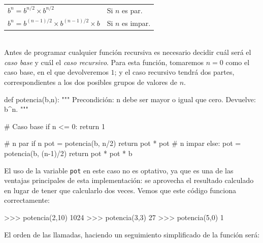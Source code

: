 \begin{tabular}{ll}
$b^n = b^{n/2} \times b^{n/2}$ & Si $n$ es par. \\
$b^n = b^{(n-1)/2} \times b^{(n-1)/2} \times b$ &  Si $n$ es impar. \\
\end{tabular} \\

Antes de programar cualquier función recursiva es necesario decidir cuál
será el {\it caso base} y cuál el {\it caso recursivo}.  Para esta función,
tomaremos $n=0$ como el caso base, en el que devolveremos $1$; y el caso
recursivo tendrá dos partes, correspondientes a los dos posibles grupos de
valores de $n$.

\begin{codigo-python-sn}
def potencia(b,n):
    """ Precondición: n debe ser mayor o igual que cero.
        Devuelve: b^n. """

    # Caso base
    if n <= 0:
        return 1

    # n par
    if n %
        pot = potencia(b, n/2)
        return pot * pot
    # n impar
    else:
        pot = potencia(b, (n-1)/2)
        return pot * pot * b
\end{codigo-python-sn}

El uso de la variable \lstinline!pot! en este caso no es optativo, ya que
es una de las ventajas principales de esta implementación: se aprovecha el
resultado calculado en lugar de tener que calcularlo dos veces. Vemos que
este código funciona correctamente:

\begin{codigo-python-sn}
>>> potencia(2,10)
1024
>>> potencia(3,3)
27
>>> potencia(5,0)
1
\end{codigo-python-sn}

El orden de las llamadas, haciendo un seguimiento simplificado de la
función será:

